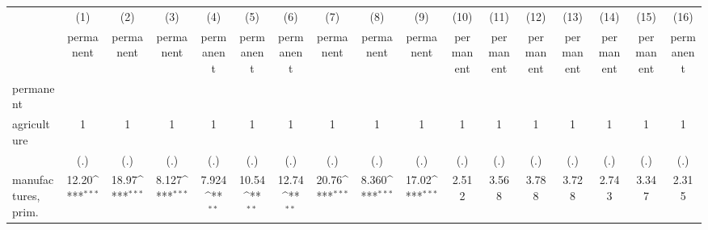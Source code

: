 {
\def\sym#1{\ifmmode^{#1}\else\(^{#1}\)\fi}
\begin{tabular}{l*{16}{c}}
\hline\hline
                    &\multicolumn{1}{c}{(1)}&\multicolumn{1}{c}{(2)}&\multicolumn{1}{c}{(3)}&\multicolumn{1}{c}{(4)}&\multicolumn{1}{c}{(5)}&\multicolumn{1}{c}{(6)}&\multicolumn{1}{c}{(7)}&\multicolumn{1}{c}{(8)}&\multicolumn{1}{c}{(9)}&\multicolumn{1}{c}{(10)}&\multicolumn{1}{c}{(11)}&\multicolumn{1}{c}{(12)}&\multicolumn{1}{c}{(13)}&\multicolumn{1}{c}{(14)}&\multicolumn{1}{c}{(15)}&\multicolumn{1}{c}{(16)}\\
                    &\multicolumn{1}{c}{permanent}&\multicolumn{1}{c}{permanent}&\multicolumn{1}{c}{permanent}&\multicolumn{1}{c}{permanent}&\multicolumn{1}{c}{permanent}&\multicolumn{1}{c}{permanent}&\multicolumn{1}{c}{permanent}&\multicolumn{1}{c}{permanent}&\multicolumn{1}{c}{permanent}&\multicolumn{1}{c}{permanent}&\multicolumn{1}{c}{permanent}&\multicolumn{1}{c}{permanent}&\multicolumn{1}{c}{permanent}&\multicolumn{1}{c}{permanent}&\multicolumn{1}{c}{permanent}&\multicolumn{1}{c}{permanent}\\
\hline
permanent           &                     &                     &                     &                     &                     &                     &                     &                     &                     &                     &                     &                     &                     &                     &                     &                     \\
agriculture         &           1         &           1         &           1         &           1         &           1         &           1         &           1         &           1         &           1         &           1         &           1         &           1         &           1         &           1         &           1         &           1         \\
                    &         (.)         &         (.)         &         (.)         &         (.)         &         (.)         &         (.)         &         (.)         &         (.)         &         (.)         &         (.)         &         (.)         &         (.)         &         (.)         &         (.)         &         (.)         &         (.)         \\
[1em]
manufactures, prim. &       12.20\sym{***}&       18.97\sym{***}&       8.127\sym{***}&       7.924\sym{**} &       10.54\sym{**} &       12.74\sym{**} &       20.76\sym{***}&       8.360\sym{***}&       17.02\sym{***}&       2.512         &       3.568         &       3.788         &       3.728         &       2.743         &       3.347         &       2.315         \\

\end{tabular}}
